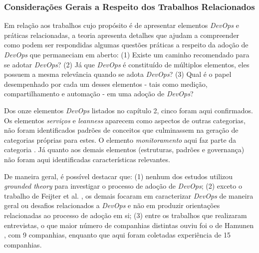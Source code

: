 \subsubsection{Considerações Gerais a Respeito dos Trabalhos Relacionados}

Em relação aos trabalhos cujo propósito é de apresentar elementos {\it DevOps} e
práticas relacionadas, a teoria apresenta detalhes que ajudam a
compreender como podem ser respondidas algumas questões práticas a
respeito da adoção de {\it DevOps} que permaneciam em aberto: (1) Existe um caminho
recomendado para se adotar \textit{DevOps}? (2) Já que \textit{DevOps} é
constituído de múltiplos elementos, eles possuem a mesma relevância quando se
adota \textit{DevOps}? (3) Qual é o papel desempenhado por cada um desses
elementos - tais como medição, compartilhamento e automação - em uma adoção de
\textit{DevOps}?

Dos onze elementos {\it DevOps} listados no capítulo 2, cinco foram aqui
confirmados. Os elementos \emph{serviços} e \emph{leanness} aparecem como
aspectos de outras categorias, não foram identificados padrões de conceitos
que culminassem na geração de categorias próprias para estes. O elemento
\emph{monitoramento} aqui faz parte da categoria . Já
quanto aos demais elementos (estruturas, padrões e governança) não foram aqui
identificadas características relevantes. 

De maneira geral, é possível destacar que: (1) nenhum dos estudos utilizou
{\it grounded theory} para investigar o processo de adoção de {\it DevOps};
(2) exceto o trabalho de Feijter et al. \cite{feijter2017towards}, os demais
focaram em caracterizar {\it DevOps} de maneira geral ou desafios relacionados
a {\it DevOps} e não em produzir orientações relacionadas ao processo de adoção
em si; (3) entre os trabalhos que realizaram entrevistas, o que maior número
de companhias distintas ouviu foi o de Hamunen \cite{challenges_in_adopting_devops},
com 9 companhias, enquanto que aqui foram coletadas experiência de 15 companhias.

